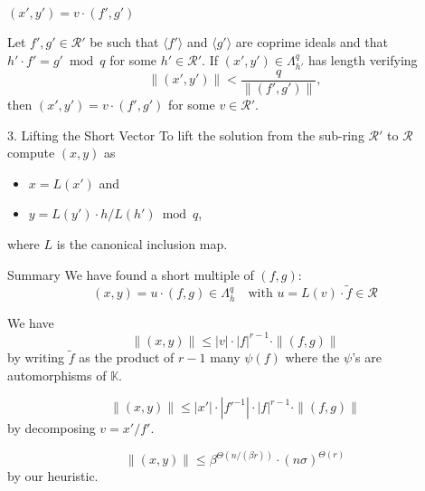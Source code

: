 \documentclass[presentation,smaller]{beamer}
\newcommand{\cR}{\ensuremath{\mathcal{R}}\xspace}
\newcommand{\K}{\ensuremath{\mathbb K}\xspace}
\begin{document}
\begin{frame}[label={sec:orge2e86d3}]{\((x',y') = v ⋅ (f',g')\)}
\begin{theorem}
Let \(f',g' \in \cR'\) be such that \(⟨ f'⟩\) and \(⟨ g'⟩\) are coprime ideals and that \(h'⋅ f' = g' \bmod q\) for some \(h' \in \cR'\). If \((x',y') \in Λ_{h'}^q\) has length verifying
\[\|(x',y') \| < \frac q {\|(f',g')\|},\]
then \((x',y') = v ⋅ (f',g')\) for some \(v ∈ \cR'\).
\end{theorem}
\end{frame}

\begin{frame}[label={sec:org0fade84}]{3. Lifting the Short Vector}
To lift the solution from the sub-ring \(\cR'\) to \(\cR\) compute \((x,y)\) as
\begin{itemize}
\item \(x = L(x')\)  and
\item \(y = L(y') ⋅ h / L(h') \bmod q\),
\end{itemize}
where \(L\) is the canonical inclusion map.
\end{frame}

\begin{frame}[label={sec:org3c713ae}]{Summary}
We have found a short multiple of \((f,g)\):
\[(x,y)  = u ⋅ (f,g) ∈ Λ_h^q \quad \text{with } u = L(v) ⋅ \tilde f \in \cR\]

\pause

We have
\[\|(x,y)\| ≤ |v| ⋅ |f|^{r-1} ⋅ \|(f,g)\|\]
by writing \(\tilde f\) as the product of \(r-1\) many \(\psi(f)\) where the \(\psi\)'s are automorphisms of \(\K\).

\pause

\[\|(x,y)\| ≤ |x'| ⋅ |f'^{-1}| ⋅ |f|^{r-1} ⋅ \|(f,g)\| \]
by decomposing \(v = x' / f'\).

\pause

\[\|(x,y)\| ≤ β^{Θ(n/(βr))} ⋅ {(nσ)}^{Θ(r)}\]
by our heuristic.
\end{frame}
\end{document}
